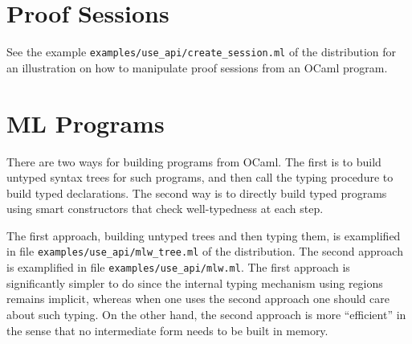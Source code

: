 \section{Proof Sessions}

See the example \verb|examples/use_api/create_session.ml| of the
distribution for an illustration on how to manipulate proof sessions
from an OCaml program.

\section{ML Programs}

There are two ways for building \whyml programs from OCaml. The first
is to build untyped syntax trees for such \whyml programs, and then
call the \why typing procedure to build typed declarations. The second
way is to directly build typed programs using smart constructors that
check well-typedness at each step.

The first approach, building untyped trees and then typing them, is
examplified in file \verb|examples/use_api/mlw_tree.ml| of the
distribution. The second approach is
examplified in file \verb|examples/use_api/mlw.ml|. The first approach
is significantly simpler to do since the internal typing mechanism
using regions remains implicit, whereas when one uses the second
approach one should care about such typing. On the other hand, the
second approach is more ``efficient'' in the sense that no
intermediate form needs to be built in memory.




